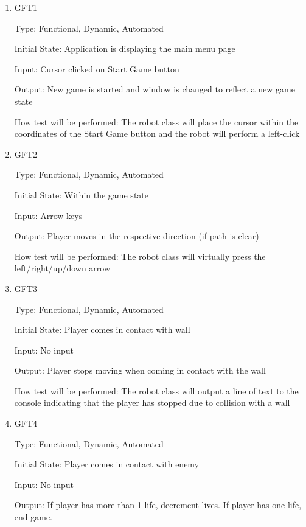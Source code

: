 \documentclass[12pt, titlepage]{article}
\begin{document}
\begin{enumerate}

\item{GFT1\\}

Type: Functional, Dynamic, Automated
					
Initial State: Application is displaying the main menu page
					
Input: Cursor clicked on Start Game button
					
Output: New game is started and window is changed to reflect a new game state
					
How test will be performed: The robot class will place the cursor within the coordinates of the Start Game button and the robot will perform a left-click
					
\item{GFT2\\}

Type: Functional, Dynamic, Automated
					
Initial State: Within the game state
					
Input: Arrow keys
					
Output: Player moves in the respective direction (if path is clear)
					
How test will be performed: The robot class will virtually press the left/right/up/down arrow

\item{GFT3\\}

Type: Functional, Dynamic, Automated
					
Initial State: Player comes in contact with wall
					
Input: No input
					
Output: Player stops moving when coming in contact with the wall

How test will be performed: The robot class will output a line of text to the console indicating that the player has stopped due to collision with a wall

\item{GFT4\\}

Type: Functional, Dynamic, Automated
					
Initial State: Player comes in contact with enemy
					
Input: No input
					
Output: If player has more than 1 life, decrement lives. If player has one life, end game.


\end{enumerate}
\end{document}
